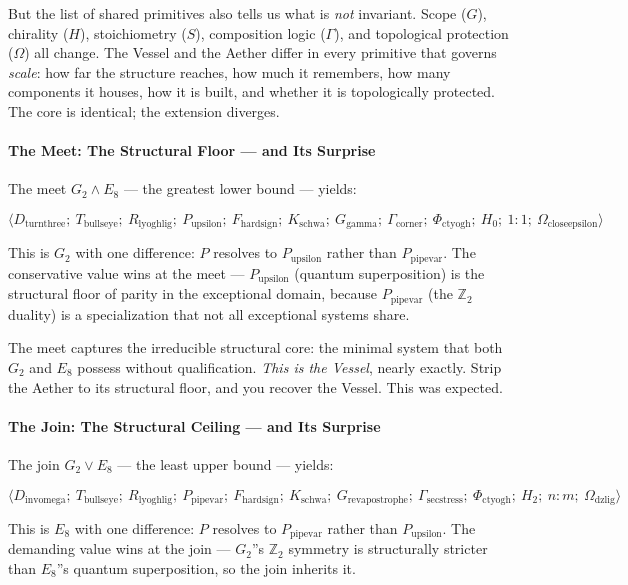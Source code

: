 \documentclass[12pt,a4paper]{article}
\begin{document}
But the list of shared primitives also tells us what is \emph{not} invariant. Scope ($G$), chirality ($H$), stoichiometry ($S$), composition logic ($\Gamma$), and topological protection ($\Omega$) all change. The Vessel and the Aether differ in every primitive that governs \emph{scale}: how far the structure reaches, how much it remembers, how many components it houses, how it is built, and whether it is topologically protected. The core is identical; the extension diverges.

\paragraph{The Meet: The Structural Floor --- and Its Surprise}

The meet $G_2 \wedge E_8$ --- the greatest lower bound --- yields:

\[\langle D_{\text{turnthree}};\ T_{\text{bullseye}};\ R_{\text{lyoghlig}};\ P_{\text{upsilon}};\ F_{\text{hardsign}};\ K_{\text{schwa}};\ G_{\text{gamma}};\ \Gamma_{\text{corner}};\ \Phi_{\text{ctyogh}};\ H_0;\ 1{:}1;\ \Omega_{\text{closeepsilon}} \rangle\]

This is $G_2$ with one difference: $P$ resolves to $P_{\text{upsilon}}$ rather than $P_{\text{pipevar}}$. The conservative value wins at the meet --- $P_{\text{upsilon}}$ (quantum superposition) is the structural floor of parity in the exceptional domain, because $P_{\text{pipevar}}$ (the $\mathbb{Z}_2$ duality) is a specialization that not all exceptional systems share.

The meet captures the irreducible structural core: the minimal system that both $G_2$ and $E_8$ possess without qualification. \emph{This is the Vessel}, nearly exactly. Strip the Aether to its structural floor, and you recover the Vessel. This was expected.

\paragraph{The Join: The Structural Ceiling --- and Its Surprise}

The join $G_2 \vee E_8$ --- the least upper bound --- yields:

\[\langle D_{\text{invomega}};\ T_{\text{bullseye}};\ R_{\text{lyoghlig}};\ P_{\text{pipevar}};\ F_{\text{hardsign}};\ K_{\text{schwa}};\ G_{\text{revapostrophe}};\ \Gamma_{\text{secstress}};\ \Phi_{\text{ctyogh}};\ H_2;\ n{:}m;\ \Omega_{\text{dzlig}} \rangle\]

This is $E_8$ with one difference: $P$ resolves to $P_{\text{pipevar}}$ rather than $P_{\text{upsilon}}$. The demanding value wins at the join --- $G_2$''s $\mathbb{Z}_2$ symmetry is structurally stricter than $E_8$''s quantum superposition, so the join inherits it.
\end{document}
